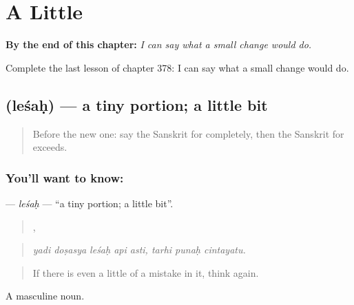 
\chapter{A Little}
\label{ch:sa-a-little}

\begin{chapteropening}
\textbf{By the end of this chapter:} \emph{I can say what a small change would do.}

Complete the last lesson of chapter 378: I can say what a small change would do.
\end{chapteropening}

\section[\texorpdfstring{\sk{लेशः} (leśaḥ)}{लेशः (leśaḥ)}]{ (leśaḥ) — a tiny portion; a little bit}

\label{lesson:SA-C378-lesah}



\begin{quote}
Before the new one: say the Sanskrit for completely, then the Sanskrit for exceeds.
\end{quote}

\subsection*{You'll want to know: }
\textbf{} — \emph{leśaḥ} — \textquotedblleft{}a tiny portion; a little bit\textquotedblright{}.

\begin{quote}
    ,   
\end{quote}

\begin{quote}
\emph{yadi doṣasya leśaḥ api asti, tarhi punaḥ cintayatu.}
\end{quote}

\begin{quote}
If there is even a little of a mistake in it, think again.
\end{quote}

A masculine noun.

